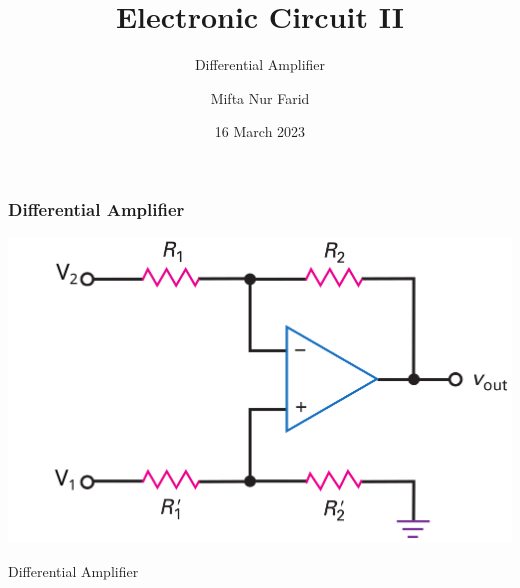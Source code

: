 \documentclass[pdflatex,compress]{beamer}
\title{Electronic Circuit II}
\subtitle{Differential Amplifier}
\author{Mifta Nur Farid}
\date{16 March 2023}
\begin{document}
\maketitle

\begin{frame}
	\frametitle{Differential Amplifier}
	\begin{center}
		\includegraphics[width=0.8\linewidth]{img/Figure-18-14a}
	\end{center}
\end{frame}

\begin{frame}{Differential Amplifier}

\end{frame}
\end{document}
